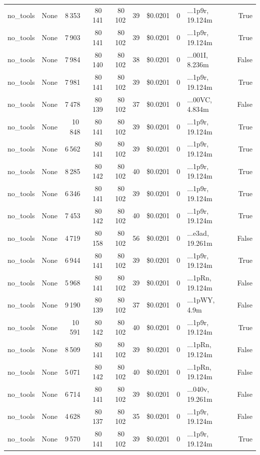 \documentclass[a4paper,11pt]{article}
\begin{document}
\begin{table}[H]
{\begin{tabular}{l r r r r r r r l r}
no\_tools & None & 8\,353 & 80\,141 & 80\,102 & 39 & \$0.0201 & 0 & ...1p9r, 19.124m & True \\
no\_tools & None & 7\,903 & 80\,141 & 80\,102 & 39 & \$0.0201 & 0 & ...1p9r, 19.124m & True \\
no\_tools & None & 7\,984 & 80\,140 & 80\,102 & 38 & \$0.0201 & 0 & ...001I, 8.236m & False \\
no\_tools & None & 7\,981 & 80\,141 & 80\,102 & 39 & \$0.0201 & 0 & ...1p9r, 19.124m & True \\
no\_tools & None & 7\,478 & 80\,139 & 80\,102 & 37 & \$0.0201 & 0 & ...00VC, 4.834m & False \\
no\_tools & None & 10\,848 & 80\,141 & 80\,102 & 39 & \$0.0201 & 0 & ...1p9r, 19.124m & True \\
no\_tools & None & 6\,562 & 80\,141 & 80\,102 & 39 & \$0.0201 & 0 & ...1p9r, 19.124m & True \\
no\_tools & None & 8\,285 & 80\,142 & 80\,102 & 40 & \$0.0201 & 0 & ...1p9r, 19.124m & True \\
no\_tools & None & 6\,346 & 80\,141 & 80\,102 & 39 & \$0.0201 & 0 & ...1p9r, 19.124m & True \\
no\_tools & None & 7\,453 & 80\,142 & 80\,102 & 40 & \$0.0201 & 0 & ...1p9r, 19.124m & True \\
no\_tools & None & 4\,719 & 80\,158 & 80\,102 & 56 & \$0.0201 & 0 & ...e3ad, 19.261m & False \\
no\_tools & None & 6\,944 & 80\,141 & 80\,102 & 39 & \$0.0201 & 0 & ...1p9r, 19.124m & True \\
no\_tools & None & 5\,968 & 80\,141 & 80\,102 & 39 & \$0.0201 & 0 & ...1pRn, 19.124m & False \\
no\_tools & None & 9\,190 & 80\,139 & 80\,102 & 37 & \$0.0201 & 0 & ...1pWY, 4.9m & False \\
no\_tools & None & 10\,591 & 80\,142 & 80\,102 & 40 & \$0.0201 & 0 & ...1p9r, 19.124m & True \\
no\_tools & None & 8\,509 & 80\,141 & 80\,102 & 39 & \$0.0201 & 0 & ...1pRn, 19.124m & False \\
no\_tools & None & 5\,071 & 80\,142 & 80\,102 & 40 & \$0.0201 & 0 & ...1pRn, 19.124m & False \\
no\_tools & None & 6\,714 & 80\,141 & 80\,102 & 39 & \$0.0201 & 0 & ...040v, 19.261m & False \\
no\_tools & None & 4\,628 & 80\,137 & 80\,102 & 35 & \$0.0201 & 0 & ...1p9r, 19.124m & False \\
no\_tools & None & 9\,570 & 80\,141 & 80\,102 & 39 & \$0.0201 & 0 & ...1p9r, 19.124m & True \\

\end{tabular}}
\end{table}
\end{document}
